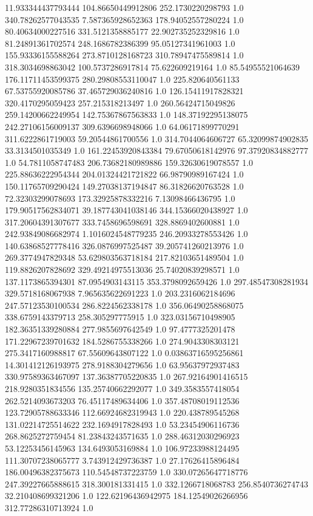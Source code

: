 11.933344437793444	104.86650449912806	252.1730220298793	1.0
340.78262577043535	7.587365928652363	178.94052557280224	1.0
80.40634000227516	331.5121358885177	22.902735252329816	1.0
81.24891361702574	248.1686782386399	95.05127341961003	1.0
155.93336155588264	273.8710128168723	310.78947475589814	1.0
318.3034698863042	100.5737286917814	75.622609219164	1.0
85.54955521064639	176.11711453599375	280.29808553110047	1.0
225.820640561133	67.53755920085786	37.465729036240816	1.0
126.15411917828321	320.4170295059423	257.215318213497	1.0
260.56424715049826	259.14200662249954	142.75367867563833	1.0
148.37192295138075	242.27106156009137	309.6396698948066	1.0
64.06171899770291	311.6222861719003	59.20544861700556	1.0
314.7044064606727	65.32099874902835	33.3134501035349	1.0
161.22453920843384	79.67050618142976	97.37920834882777	1.0
54.7811058747483	206.73682180989886	159.32630619078557	1.0
225.88636222954344	204.01324421721822	66.98790989167424	1.0
150.11765709290424	149.27038137194847	86.31826620763528	1.0
72.32303299078693	173.32925878332216	7.13098466436795	1.0
179.90517562834071	39.187743041038146	344.15366020438927	1.0
317.20604391307677	333.7458696598691	328.8869402600881	1.0
242.93849086682974	1.1016024548779235	246.20933278553426	1.0
140.63868527778416	326.0876997525487	39.205741260213976	1.0
269.3774947829348	53.629803563718184	217.82103651489504	1.0
119.8826207828692	329.49214975513036	25.74020839298571	1.0
137.1173865394301	87.0954903143115	353.3798092659426	1.0
297.48547308281934	329.5718168067938	7.965635622691223	1.0
203.2316062184696	247.57123530100534	286.8224562338178	1.0
356.06490258868075	338.6759143379713	258.305297775915	1.0
323.03156710498905	182.36351339280884	277.9855697642549	1.0
97.4777325201478	171.22967239701632	184.5286755338266	1.0
274.9043308303121	275.3417160988817	67.55609643807122	1.0
0.03863716595256861	14.301412126193975	278.9188304279656	1.0
63.95637972937483	330.97589363467097	137.36387705220835	1.0
267.92164901416515	218.9280351834556	135.25740662292077	1.0
349.3583557418054	262.5214093673203	76.45117489634406	1.0
357.48708019112536	123.72905788633346	112.66924682319943	1.0
220.438789545268	131.02214725514622	232.1694917828493	1.0
53.23454906116736	268.8625272759454	81.23843243571635	1.0
288.46312030296923	53.12253456145963	134.6493053169884	1.0
106.97233988124495	111.30707238065777	3.743912429736387	1.0
27.17626415896484	186.00496382375673	110.54548737223759	1.0
330.07265647718776	247.39227665888615	318.300181331415	1.0
332.1266718068783	256.8540736274743	32.210408699321206	1.0
122.62196436942975	184.12549026266956	312.77286310713924	1.0
